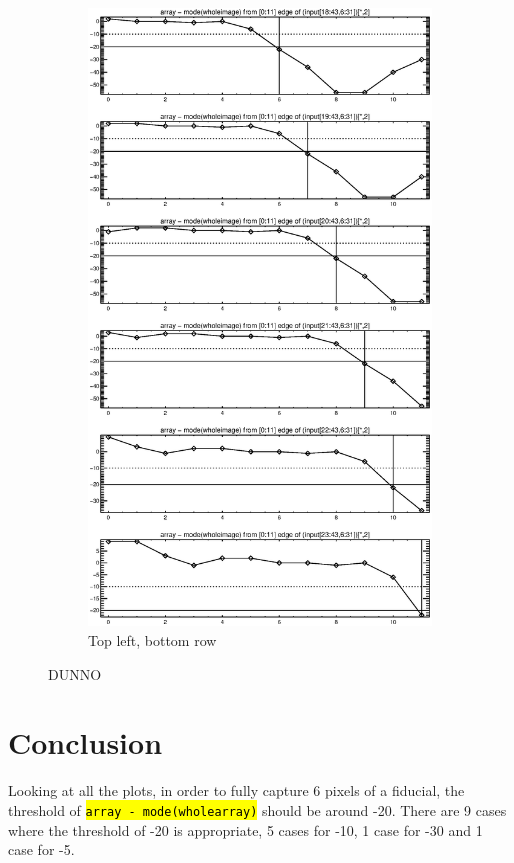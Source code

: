 \documentclass[10pt]{article}
\begin{document}
\begin{figure}[!h]
\begin{subfigure}[b]{.4\linewidth}
        \centering
        \includegraphics[width=1.4\textwidth]{../plots_tables_images/topright3.eps} 
        \caption{Top left, bottom row}
    \end{subfigure}
    \caption{DUNNO}
\end{figure}

\clearpage

\section{Conclusion} %
\label{sec:conclusion}
    
    Looking at all the plots, in order to fully capture 6 pixels of a fiducial, the threshold of \hl{\texttt{array - mode(wholearray)}} should be around -20. There are 9 cases where the threshold of -20 is appropriate, 5 cases for -10, 1 case for -30 and 1 case for -5.


\end{document}
